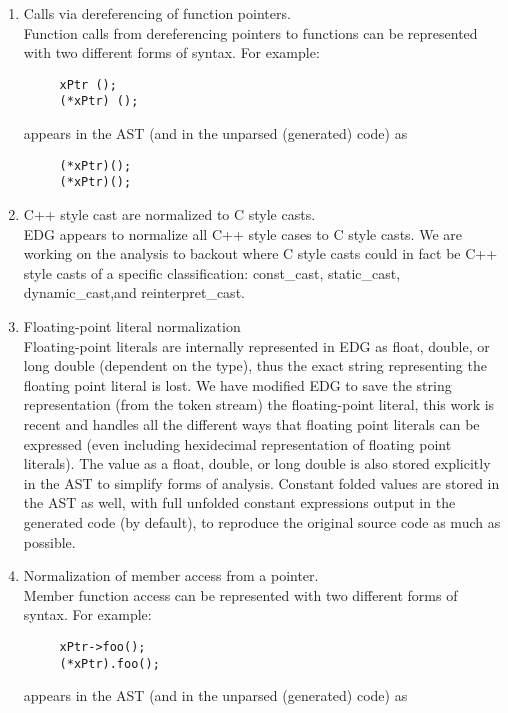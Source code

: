 \begin{enumerate}
     \item Calls via dereferencing of function pointers. \\
     Function calls from dereferencing pointers to functions can be represented with two 
     different forms of syntax. For example:
{\indent
{\mySmallFontSize

\begin{verbatim}
     xPtr ();
     (*xPtr) ();
\end{verbatim}
}}
     appears in the AST (and in the unparsed (generated) code) as
{\indent
{\mySmallFontSize

\begin{verbatim}
     (*xPtr)();
     (*xPtr)();
\end{verbatim}
}}

     \item C++ style cast are normalized to C style casts. \\
     EDG appears to normalize all C++ style cases to C style casts. We are
     working on the analysis to backout where C style casts could in fact
     be C++ style casts of a specific classification: const\_cast, static\_cast,
     dynamic\_cast,and reinterpret\_cast.

     \item Floating-point literal normalization \\
     Floating-point literals are internally represented in EDG as float, double, or long
     double (dependent on the type), thus the exact string representing the floating point
     literal is lost.  We have modified EDG to save the string representation (from the
     token stream) the floating-point literal, this work is recent and handles all the
     different ways that floating point literals can be expressed (even including
     hexidecimal representation of floating point literals).  The value as a float, double,
     or long double is also stored explicitly in the AST to simplify forms of analysis.
     Constant folded values are stored in the AST as well, with full unfolded constant 
     expressions output in the generated code (by default), to reproduce the original 
     source code as much as possible.

     \item Normalization of member access from a pointer. \\
     Member function access can be represented with two different forms of syntax. For example:
{\indent
{\mySmallFontSize

\begin{verbatim}
     xPtr->foo();
     (*xPtr).foo();
\end{verbatim}
}}
     appears in the AST (and in the unparsed (generated) code) as
{\indent
{\mySmallFontSize

}}
\end{enumerate}
